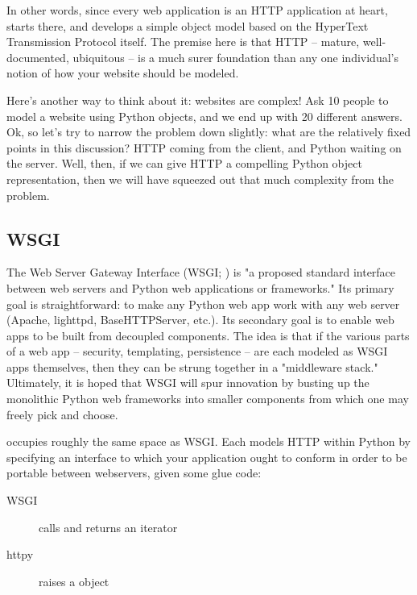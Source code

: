 In other words, since every web application is an HTTP application at heart,
 starts there, and develops a simple object model based on the
HyperText Transmission Protocol itself. The premise here is that HTTP -- mature,
well-documented, ubiquitous -- is a much surer foundation than any one
individual's notion of how your website should be modeled.

Here's another way to think about it: websites are complex! Ask 10 people to
model a website using Python objects, and we end up with 20 different answers.
Ok, so let's try to narrow the problem down slightly: what are the relatively
fixed points in this discussion? HTTP coming from the client, and Python waiting
on the server. Well, then, if we can give HTTP a compelling Python object
representation, then we will have squeezed out that much complexity from the
problem.


\subsection{WSGI}

The Web Server Gateway Interface (WSGI; ) is "a proposed standard
interface between web servers and Python web applications or frameworks." Its
primary goal is straightforward: to make any Python web app work with any web
server (Apache, lighttpd, BaseHTTPServer, etc.). Its secondary goal is to enable
web apps to be built from decoupled components. The idea is that if the various
parts of a web app -- security, templating, persistence -- are each modeled as
WSGI apps themselves, then they can be strung together in a "middleware stack."
Ultimately, it is hoped that WSGI will spur innovation by busting up the
monolithic Python web frameworks into smaller components from which one may
freely pick and choose.

 occupies roughly the same space as WSGI. Each models HTTP within
Python by specifying an interface to which your application ought to conform in
order to be portable between webservers, given some glue code:

\begin{description}

\item[WSGI]
    { calls  and returns
    an iterator}

\item[httpy]
    { raises a  object}

\end{description}


